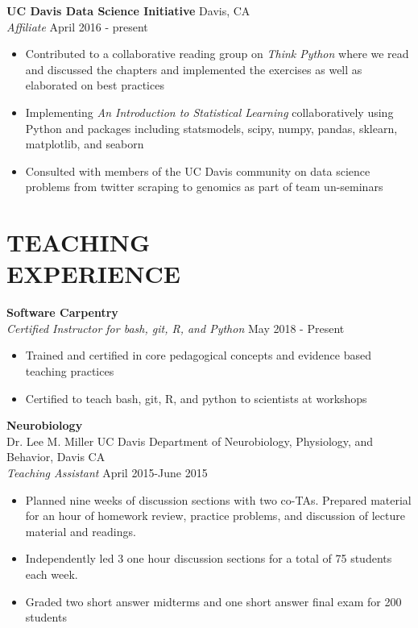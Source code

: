\documentclass[line,margin,10pt]{res}
\begin{document}
\begin{resume}
\textbf{UC Davis Data Science Initiative} \hfill  Davis, CA \\
{\sl Affiliate} \hfill April 2016 - present
\begin{itemize} \itemsep -2pt
\item Contributed to a collaborative reading group on {\sl Think Python} where we read and discussed the chapters and implemented the exercises as well as elaborated on best practices
\item Implementing {\sl An Introduction to Statistical Learning} collaboratively using Python and packages including statsmodels, scipy, numpy, pandas, sklearn, matplotlib, and seaborn
\item Consulted with members of the UC Davis community on data science problems from twitter scraping to genomics as part of team un-seminars
\end{itemize}
 
  \section{TEACHING\\EXPERIENCE} 
  
   \textbf{Software Carpentry} \\ 
 {\sl Certified Instructor for bash, git, R, and Python} \hfill May 2018 - Present
 \begin{itemize}\itemsep -2pt
 \item Trained and certified in core pedagogical concepts and evidence based teaching practices
 \item Certified to teach bash, git, R, and python to scientists at workshops 
 \end{itemize}
 
 \textbf{Neurobiology}\\
 Dr. Lee M. Miller \hfill UC Davis Department of Neurobiology, Physiology, and Behavior, Davis CA\\
 {\sl Teaching Assistant} \hfill April 2015-June 2015
 \begin{itemize}\itemsep -2pt
 \item Planned nine weeks of discussion sections with two co-TAs. Prepared material for an hour of homework review, practice problems, and discussion of lecture material and readings.
 \item Independently led 3 one hour discussion sections for a total of 75 students each week.
 \item Graded two short answer midterms and one short answer final exam for 200 students  \end{itemize}
 

\end{resume}
\end{document}

